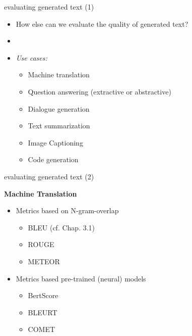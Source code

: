
\begin{frame}{evaluating generated text (1)}

\vfill

\begin{itemize}
	\item \ques How else can we evaluate the quality of generated text?
	\item[]
	\item \textit{Use cases:} 
			\begin{itemize}
				\item Machine translation
				\item Question answering (extractive or abstractive)
				\item Dialogue generation
				\item Text summarization
				\item Image Captioning
				\item Code generation
			\end{itemize}
\end{itemize}

\vfill

\end{frame}


\begin{frame}{evaluating generated text (2)}

\vfill

\textbf{Machine Translation}

\begin{itemize}
	\item Metrics based on N-gram-overlap
			\begin{itemize}
				\item BLEU (cf. Chap. 3.1) 
				\item ROUGE 
				\item METEOR 
			\end{itemize}
	\item Metrics based pre-trained (neural) models
			\begin{itemize}
				\item BertScore 
				\item BLEURT 
				\item COMET 
			\end{itemize}
\end{itemize}

\vfill

\end{frame}

